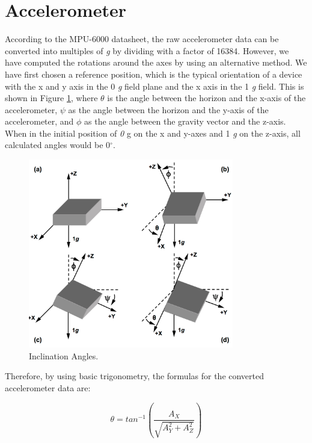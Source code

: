 \section{Accelerometer}\label{accelEqs}
According to the MPU-6000 datasheet\cite{MPU6000}, the raw accelerometer data can be converted into multiples of \textit{g} by dividing with a factor of 16384. However, we have computed the rotations around the axes by using an alternative method. We have first chosen a reference position, which is the typical orientation of a device with the x and y axis in the 0 \textit{g} field plane and the x axis in the 1 \textit{g} field. This is shown in Figure \ref{acc}, where $\theta$ is the angle between the horizon and the x-axis of the accelerometer, $\psi$ as the angle between the horizon and the y-axis of the accelerometer, and
$\phi$ as the angle between the gravity vector and the z-axis. When in the initial position of \textit{0} g on the x and y-axes and 1 \textit{g} on the z-axis, all calculated angles would be 0$^{\circ}$.\cite{AccelCite1}

\begin{figure}[H]
  \centering
    \includegraphics[width=0.8\textwidth]{images/accangle.png}
	\caption{Inclination Angles. \cite{AccelCite1}}
	\label{acc}
\end{figure} 

Therefore, by using basic trigonometry, the formulas for the converted accelerometer data are:

\begin{equation}	
 	\theta=tan^{-1}\left(\frac{A_{X}}{\sqrt{A_{Y}^{2}+A_{Z}^{2}}}\right)
 \end{equation}
 
